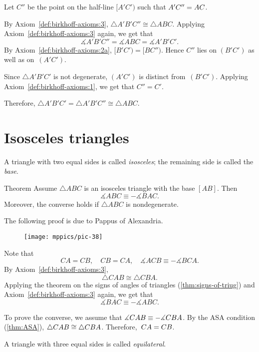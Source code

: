 Let $C''$ be the point on the half-line $[A' C')$ such that $A' C''=A C$. 

By Axiom~\ref{def:birkhoff-axioms:3}, 
$\triangle A' B' C''\cong \triangle A B C$. 
Applying Axiom~\ref{def:birkhoff-axioms:3} again,
we get that
$$\measuredangle A' B' C'' = \measuredangle A B C=\measuredangle A' B' C'.$$
By Axiom~\ref{def:birkhoff-axioms:2a}, $[B'C')=[B C'')$. 
Hence
$C''$ lies on $(B' C')$ as well as on~$(A' C')$.

Since $\triangle A' B' C'$ is not degenerate, $(A' C')$ is distinct from~$(B' C')$.
Applying Axiom~\ref{def:birkhoff-axioms:1}, we get that $C''=C'$. 

Therefore, 
$\triangle A' B' C'=\triangle A' B' C''\cong\triangle A B C$.
\qeds

\section{Isosceles triangles}

A triangle with two equal sides is called \emph{isosceles};
the remaining side is called the \emph{base}.


\begin{thm}[\abs]{Theorem}\label{thm:isos}
Assume $\triangle A B C$ is an isosceles triangle with the base $[A B]$. 
Then 
$$\measuredangle A B C\equiv -\measuredangle B A C.$$
Moreover, the converse holds if $\triangle A B C$ is nondegenerate.
\end{thm}

The following proof is due to Pappus of Alexandria.

\begin{wrapfigure}[9]{r}{25mm}
\vskip-4mm
\centering
\texttt{[image: mppics/pic-38]}
\end{wrapfigure}

Note that
$$C A = C B,
\quad 
C B=C A,
\quad
\measuredangle A C B \equiv -\measuredangle B C A.$$
By Axiom~\ref{def:birkhoff-axioms:3},
$$\triangle C A B\cong\triangle C B A.$$
Applying the theorem on the signs of angles of triangles (\ref{thm:signs-of-triug}) and Axiom~\ref{def:birkhoff-axioms:3} again,
we get that 
$$\measuredangle B A C
\equiv -\measuredangle A B C.$$

To prove the converse, we assume that
$\measuredangle C A B \equiv - \measuredangle C B A$.
By the ASA condition (\ref{thm:ASA}), $\triangle C A B\cong\triangle CBA$.
Therefore,~$C A=C B$.
\qeds

A triangle with three equal sides is called \emph{equilateral}. 


